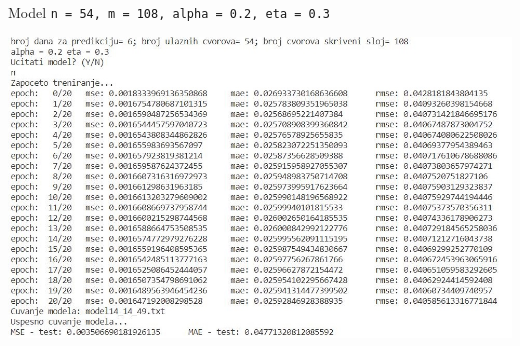 \documentclass{beamer}
\begin{document}

\begin{frame}{\small{Model \texttt{n = 54, m = 108, alpha = 0.2, eta = 0.3}}}
    \begin{center}
    \includegraphics[scale=0.55]{output/output_example_program_14_14_49.JPG}
    \end{center}
\end{frame}
\end{document}
